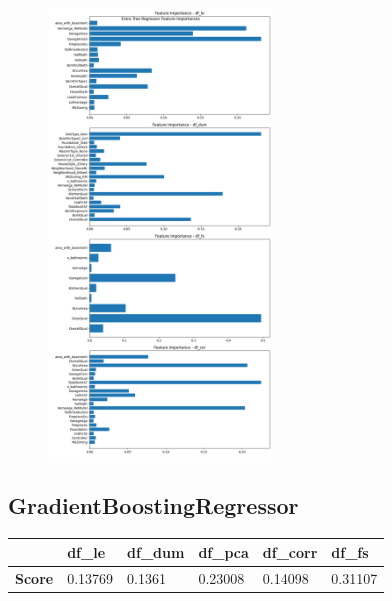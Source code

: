 \begin{figure}[H]
  \centering
  \includegraphics[width=0.53\textwidth]{./fig/etcfeas.png}
  \label{fig:corr1}
  \caption{}
\end{figure}








\subsection{GradientBoostingRegressor}
\begin{table}[H]
\begin{tabular}{l|l|l|l|l|l|}
\cline{2-6}
                                    & \textbf{df\_le} & \textbf{df\_dum} & \textbf{df\_pca} & \textbf{df\_corr} & \textbf{df\_fs} \\ \hline
\multicolumn{1}{|l|}{\textbf{Score}} & 0.13769         & 0.1361           & 0.23008          & 0.14098           & 0.31107         \\ \hline
\end{tabular}
\end{table}



